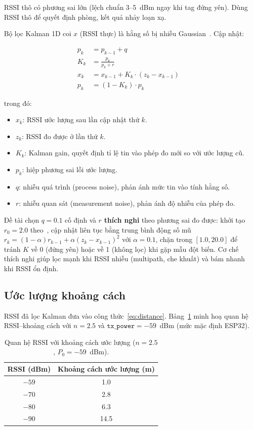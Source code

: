 RSSI thô có phương sai lớn (lệch chuẩn 3--5~dBm ngay khi tag đứng yên). Dùng RSSI thô để quyết định phòng, kết quả nhảy loạn xạ.

Bộ lọc Kalman 1D coi $x$ (RSSI thực) là hằng số bị nhiễu Gaussian~\cite{kalman-1960}. Cập nhật:

\begin{align}
    p_k &= p_{k-1} + q \label{eq:kalman-predict}\\
    K_k &= \frac{p_k}{p_k + r} \label{eq:kalman-gain}\\
    x_k &= x_{k-1} + K_k \cdot (z_k - x_{k-1}) \label{eq:kalman-update}\\
    p_k &= (1 - K_k) \cdot p_k \label{eq:kalman-cov}
\end{align}

trong đó:
\begin{itemize}
    \item $x_k$: RSSI ước lượng sau lần cập nhật thứ $k$.
    \item $z_k$: RSSI đo được ở lần thứ $k$.
    \item $K_k$: Kalman gain, quyết định tỉ lệ tin vào phép đo mới so với ước lượng cũ.
    \item $p_k$: hiệp phương sai lỗi ước lượng.
    \item $q$: nhiễu quá trình (process noise), phản ánh mức tin vào tính hằng số.
    \item $r$: nhiễu quan sát (measurement noise), phản ánh độ nhiễu của phép đo.
\end{itemize}

Đề tài chọn $q = 0.1$ cố định và \textbf{$r$ thích nghi} theo phương sai đo được: khởi tạo $r_0 = 2.0$ theo~\cite{zhuang-kalman-ble}, cập nhật liên tục bằng trung bình động số mũ $r_k = (1 - \alpha) r_{k-1} + \alpha (z_k - x_{k-1})^2$ với $\alpha = 0.1$, chặn trong $[1.0, 20.0]$ để tránh $K$ về 0 (đứng yên) hoặc về 1 (không lọc) khi gặp mẫu đột biến. Cơ chế thích nghi giúp lọc mạnh khi RSSI nhiễu (multipath, che khuất) và bám nhanh khi RSSI ổn định.

\subsection{Ước lượng khoảng cách}

RSSI đã lọc Kalman đưa vào công thức~\eqref{eq:distance}. Bảng~\ref{tab:rssi-distance} minh hoạ quan hệ RSSI--khoảng cách với $n = 2.5$ và $\texttt{tx\_power} = -59$~dBm (mức mặc định ESP32).

\begin{table}[htp]
    \centering
    \caption{Quan hệ RSSI với khoảng cách ước lượng ($n = 2.5$, $P_0 = -59$~dBm).}
    \label{tab:rssi-distance}
    \begin{tabular}{cc}
        \hline
        \textbf{RSSI (dBm)} & \textbf{Khoảng cách ước lượng (m)} \\
        \hline
        $-59$ & 1.0 \\
        $-70$ & 2.8 \\
        $-80$ & 6.3 \\
        $-90$ & 14.5 \\
        \hline
    \end{tabular}
\end{table}

